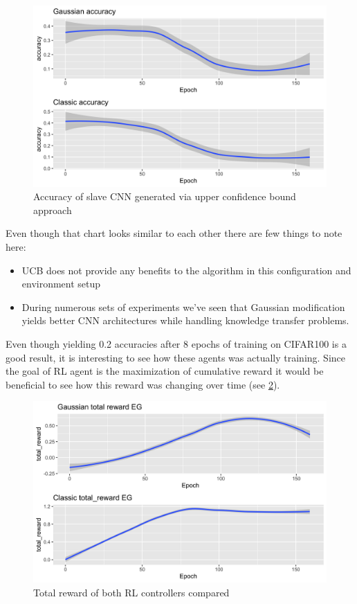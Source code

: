 \begin{figure}[!htb]
  \includegraphics[width=\linewidth]{images/ucb.png}
  \caption{Accuracy of slave CNN generated via upper confidence bound approach}
  \label{fig:ucbs}
\end{figure}

Even though that chart looks similar to each other there are few things to note here:

\begin{itemize}
\item UCB does not provide any benefits to the algorithm in this configuration and environment setup
\item During numerous sets of experiments we've seen that Gaussian modification yields better CNN architectures while handling knowledge transfer problems.
\end{itemize}

Even though yielding 0.2 accuracies after 8 epochs of training on CIFAR100 is a good result, it is interesting to see how these agents was actually training. Since the goal of RL agent is the maximization of cumulative reward it would be beneficial to see how this reward was changing over time (see \ref{fig:totrewegreedy}).

\begin{figure}[!htb]
  \includegraphics[width=\linewidth]{images/total_reward_epsilon_greedy.png}
  \caption{Total reward of both RL controllers compared}
  \label{fig:totrewegreedy}
\end{figure}

